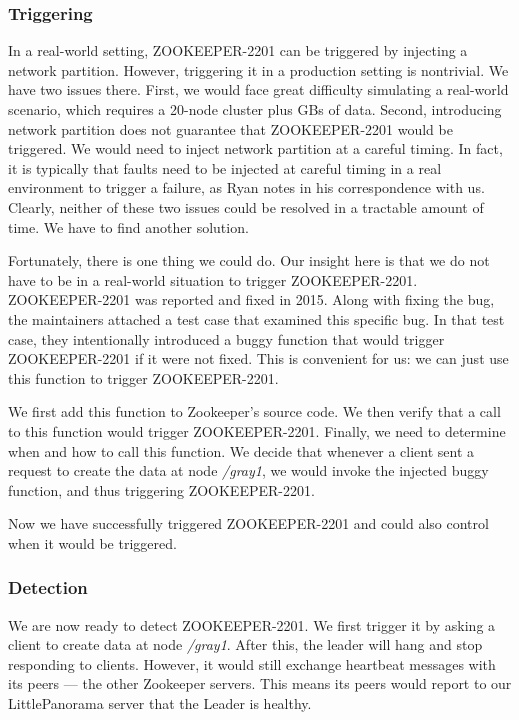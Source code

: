 \subsubsection{Triggering}
\label{subsubsec:2201trigger}
In a real-world setting, ZOOKEEPER-2201 can be triggered by injecting a network partition. However, triggering it in a production setting is nontrivial. We have two issues there. First, we would face great difficulty simulating a real-world scenario, which requires a 20-node cluster plus GBs of data. Second, introducing network partition does not guarantee that ZOOKEEPER-2201 would be triggered. We would need to inject network partition at a careful timing. In fact, it is typically that faults need to be injected at careful timing in a real environment to trigger a failure, as Ryan notes in his correspondence with us. Clearly, neither of these two issues could be resolved in a tractable amount of time. We have to find another solution.

Fortunately, there is one thing we could do. Our insight here is that we do not have to be in a real-world situation to trigger ZOOKEEPER-2201. ZOOKEEPER-2201 was reported and fixed in 2015. Along with fixing the bug, the maintainers attached a test case that examined this specific bug. In that test case, they intentionally introduced a buggy function that would trigger ZOOKEEPER-2201 if it were not fixed. This is convenient for us: we can just use this function to trigger ZOOKEEPER-2201. 

We first add this function to Zookeeper's source code. We then verify that a call to this function would trigger ZOOKEEPER-2201. Finally, we need to determine when and how to call this function. We decide that whenever a client sent a request to create the data at node \textit{/gray1}, we would invoke the injected buggy function, and thus triggering ZOOKEEPER-2201. 

Now we have successfully triggered ZOOKEEPER-2201 and could also control when it would be triggered. 

\subsubsection{Detection}
\label{subsubsec:2201detection}
We are now ready to detect ZOOKEEPER-2201. We first trigger it by asking a client to create data at node \textit{/gray1}. After this, the leader will hang and stop responding to clients. However, it would still exchange heartbeat messages with its peers --- the other Zookeeper servers. This means its peers would report to our LittlePanorama server that the Leader is healthy.

